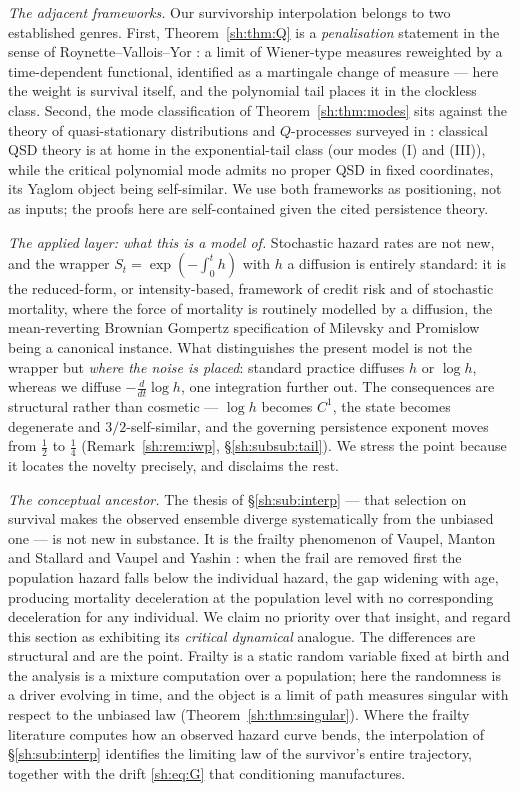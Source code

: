 \documentclass[11pt]{article}
\numberwithin{equation}{section}
\theoremstyle{plain}
\theoremstyle{definition}
\theoremstyle{remark}
\begin{document}
\emph{The adjacent frameworks.} Our survivorship interpolation belongs
to two established genres. First, Theorem~\ref{sh:thm:Q} is a
\emph{penalisation} statement in the sense of Roynette--Vallois--Yor
\cite{RVY06}: a limit of Wiener-type measures reweighted by a
time-dependent functional, identified as a martingale change of measure
--- here the weight is survival itself, and the polynomial tail places
it in the clockless class. Second, the mode classification of
Theorem~\ref{sh:thm:modes} sits against the theory of quasi-stationary
distributions and $Q$-processes surveyed in \cite{MV12}: classical QSD
theory is at home in the exponential-tail class (our modes (I) and
(III)), while the critical polynomial mode admits no proper QSD in fixed
coordinates, its Yaglom object being self-similar. We use both
frameworks as positioning, not as inputs; the proofs here are
self-contained given the cited persistence theory.

\emph{The applied layer: what this is a model of.} Stochastic hazard
rates are not new, and the wrapper $S_t=\exp(-\int_0^th)$ with $h$ a
diffusion is entirely standard: it is the reduced-form, or
intensity-based, framework of credit risk \cite{Lan04} and of stochastic
mortality, where the force of mortality is routinely modelled by a
diffusion, the mean-reverting Brownian Gompertz specification of Milevsky
and Promislow \cite{MP01} being a canonical instance. What distinguishes
the present model is not the wrapper but \emph{where the noise is
placed}: standard practice diffuses $h$ or $\log h$, whereas we diffuse
$-\tfrac{d}{dt}\log h$, one integration further out. The consequences are
structural rather than cosmetic --- $\log h$ becomes $C^1$, the state
becomes degenerate and $3/2$-self-similar, and the governing persistence
exponent moves from $\tfrac12$ to $\tfrac14$ (Remark~\ref{sh:rem:iwp},
\S\ref{sh:subsub:tail}). We stress the point because it locates the
novelty precisely, and disclaims the rest.

\emph{The conceptual ancestor.} The thesis of \S\ref{sh:sub:interp} ---
that selection on survival makes the observed ensemble diverge
systematically from the unbiased one --- is not new in substance. It is
the frailty phenomenon of Vaupel, Manton and Stallard \cite{VMS79} and
Vaupel and Yashin \cite{VY85}: when the frail are removed first the
population hazard falls below the individual hazard, the gap widening
with age, producing mortality deceleration at the population level with
no corresponding deceleration for any individual. We claim no priority
over that insight, and regard this section as exhibiting its
\emph{critical dynamical} analogue. The differences are structural and
are the point. Frailty is a static random variable fixed at birth and the
analysis is a mixture computation over a population; here the randomness
is a driver evolving in time, and the object is a limit of path measures
singular with respect to the unbiased law
(Theorem~\ref{sh:thm:singular}). Where the frailty literature computes
how an observed hazard curve bends, the interpolation of
\S\ref{sh:sub:interp} identifies the limiting law of the survivor's
entire trajectory, together with the drift \eqref{sh:eq:G} that
conditioning manufactures.
\end{document}
